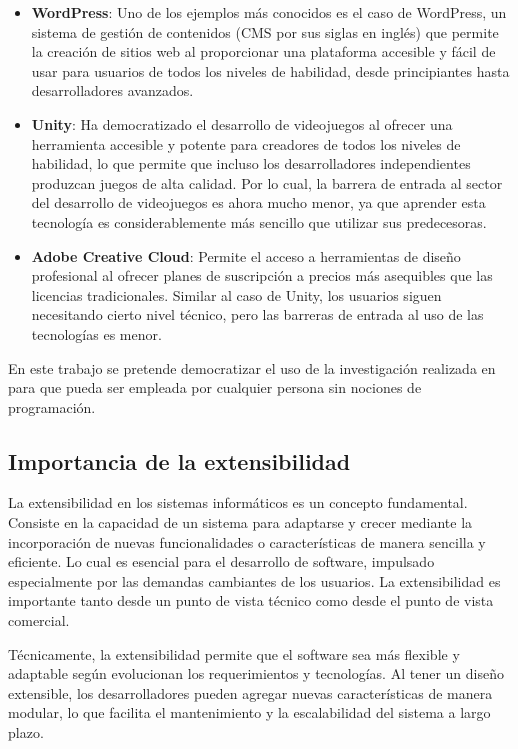 \begin{itemize}
	
	\item \textbf{WordPress}: Uno de los ejemplos más conocidos es el caso de WordPress, un sistema de gestión de contenidos (CMS por sus siglas en inglés) que permite la creación de sitios web al proporcionar una plataforma accesible y fácil de usar para usuarios de todos los niveles de habilidad, desde principiantes hasta desarrolladores avanzados.
	
	\item \textbf{Unity}: Ha democratizado el desarrollo de videojuegos al ofrecer una herramienta accesible y potente para creadores de todos los niveles de habilidad, lo que permite que incluso los desarrolladores independientes produzcan juegos de alta calidad. Por lo cual, la barrera de entrada al sector del desarrollo de videojuegos es ahora mucho menor, ya que aprender esta tecnología es considerablemente más sencillo que utilizar sus predecesoras.
	
	\item \textbf{Adobe Creative Cloud}: Permite el acceso a herramientas de diseño profesional al ofrecer planes de suscripción a precios más asequibles que las licencias tradicionales. Similar al caso de Unity, los usuarios siguen necesitando cierto nivel técnico, pero las barreras de entrada al uso de las tecnologías es menor.

	
\end{itemize}

En este trabajo se pretende democratizar el uso de la investigación realizada en \ga  para que pueda ser empleada por cualquier persona sin nociones de programación.

\subsection{Importancia de la extensibilidad}

La extensibilidad en los sistemas informáticos es un concepto fundamental. Consiste en la capacidad de un sistema para adaptarse y crecer mediante la incorporación de nuevas funcionalidades o características de manera sencilla y eficiente. Lo cual es esencial para el desarrollo de software, impulsado especialmente por las demandas cambiantes de los usuarios. La extensibilidad es importante tanto desde un punto de vista técnico como desde el punto de vista comercial.

Técnicamente, la extensibilidad permite que el software sea más flexible y adaptable según evolucionan los requerimientos y tecnologías. Al tener un diseño extensible, los desarrolladores pueden agregar nuevas características de manera modular, lo que facilita el mantenimiento y la escalabilidad del sistema a largo plazo.

